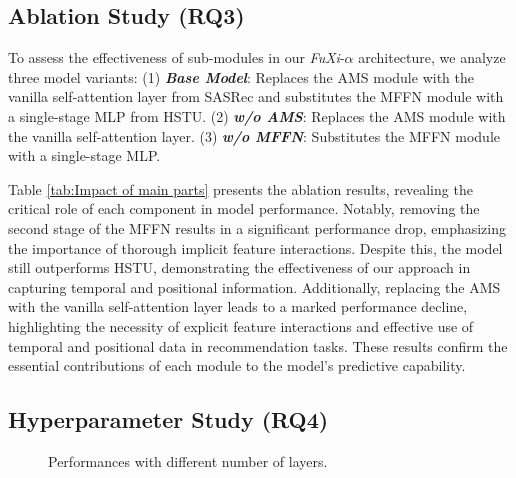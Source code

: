  
\subsection{Ablation Study (RQ3)}
 

To assess the effectiveness of sub-modules in our \textit{FuXi}-$\alpha$ architecture, we analyze three model variants: 
(1) \textbf{\textsl{Base Model}}: Replaces the AMS module with the vanilla self-attention layer from SASRec and substitutes the MFFN module with a single-stage MLP from HSTU. 
(2) \textbf{\textsl{w/o AMS}}: Replaces the AMS module with the vanilla self-attention layer. 
(3) \textbf{\textsl{w/o MFFN}}: Substitutes the MFFN module with a single-stage MLP.

Table \ref{tab:Impact of main parts} presents the ablation results, revealing the critical role of each component in model performance. Notably, removing the second stage of the MFFN results in a significant performance drop, emphasizing the importance of thorough implicit feature interactions. Despite this, the model still outperforms HSTU, demonstrating the effectiveness of our approach in capturing temporal and positional information. Additionally, replacing the AMS with the vanilla self-attention layer leads to a marked performance decline, highlighting the necessity of explicit feature interactions and effective use of temporal and positional data in recommendation tasks. These results confirm the essential contributions of each module to the model's predictive capability.

\subsection{Hyperparameter Study (RQ4)}


\begin{figure}[t]
    \centering    
    \setlength{\abovecaptionskip}{0pt}
    \setlength{\belowcaptionskip}{-5pt}
    \caption{Performances with different number of layers.}     
    \label{fig:layer}   
\end{figure}


